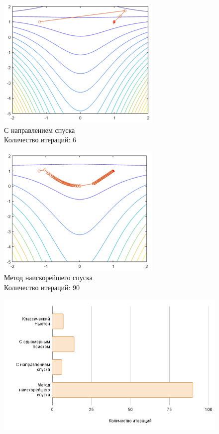 \documentclass[12pt]{article}
\begin{document}
\begin{enumerate}
	\begin{figure}[H]
	\begin{minipage}{.5\textwidth}
    	\centering
    	\includegraphics[scale=0.75]{img/f4_3.png}
		\\ С направлением спуска
		\\ Количество итераций: 6
	\end{minipage}
    \begin{minipage}{.5\textwidth}
    \centering
    	\includegraphics[scale=0.75]{img/f4_4.png}
    	\\ Метод наискорейшего спуска
    	\\ Количество итераций: 90
    \end{minipage}
    \end{figure}

    \begin{figure}[H]
    	\centering
    	\includegraphics[scale=0.6]{img/chart_1.png}
    \end{figure}
\end{enumerate}
\end{document}
